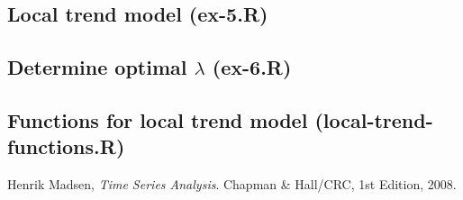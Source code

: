 \documentclass[11pt]{article}
\begin{document}
\subsection*{Local trend model (ex-5.R)}

\subsection*{Determine optimal $\lambda$ (ex-6.R)}

\subsection*{Functions for local trend model (local-trend-functions.R)}



\pagebreak

\begin{thebibliography}{9}

  Henrik Madsen,
  \emph{Time Series Analysis}.
  Chapman \& Hall/CRC,
  1st Edition,
  2008.

\end{thebibliography}
\end{document}
